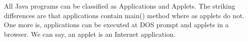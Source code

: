 \begin{notebox}\nospacing
  All Java programs can be classified as Applications and Applets. The striking differences are that applications contain main() method where as applets do not. One more is, applications can be executed at DOS prompt and applets in a browser. We can say, an applet is an Internet application.
\end{notebox}
